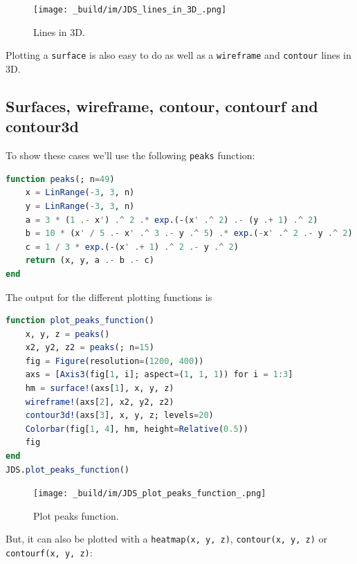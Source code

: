 \documentclass[
  notoc %
]{tufte-book}
\newcommand{\passthrough}[1]{#1}
\begin{document}
\begin{figure}
\hypertarget{fig:lines_in_3D}{%
\centering
\texttt{[image: \_build/im/JDS\_lines\_in\_3D\_.png]}
\caption{Lines in 3D.}\label{fig:lines_in_3D}
}
\end{figure}

Plotting a \passthrough{\lstinline!surface!} is also easy to do as well
as a \passthrough{\lstinline!wireframe!} and
\passthrough{\lstinline!contour!} lines in 3D.

\hypertarget{surfaces-wireframe-contour-contourf-and-contour3d}{%
\subsection{Surfaces, wireframe, contour, contourf and
contour3d}\label{surfaces-wireframe-contour-contourf-and-contour3d}}

To show these cases we'll use the following
\passthrough{\lstinline!peaks!} function:

\begin{lstlisting}[language=Julia]
function peaks(; n=49)
    x = LinRange(-3, 3, n)
    y = LinRange(-3, 3, n)
    a = 3 * (1 .- x') .^ 2 .* exp.(-(x' .^ 2) .- (y .+ 1) .^ 2)
    b = 10 * (x' / 5 .- x' .^ 3 .- y .^ 5) .* exp.(-x' .^ 2 .- y .^ 2)
    c = 1 / 3 * exp.(-(x' .+ 1) .^ 2 .- y .^ 2)
    return (x, y, a .- b .- c)
end
\end{lstlisting}

The output for the different plotting functions is

\begin{lstlisting}[language=Julia]
function plot_peaks_function()
    x, y, z = peaks()
    x2, y2, z2 = peaks(; n=15)
    fig = Figure(resolution=(1200, 400))
    axs = [Axis3(fig[1, i]; aspect=(1, 1, 1)) for i = 1:3]
    hm = surface!(axs[1], x, y, z)
    wireframe!(axs[2], x2, y2, z2)
    contour3d!(axs[3], x, y, z; levels=20)
    Colorbar(fig[1, 4], hm, height=Relative(0.5))
    fig
end
JDS.plot_peaks_function()
\end{lstlisting}

\begin{figure}
\hypertarget{fig:plot_peaks_function}{%
\centering
\texttt{[image: \_build/im/JDS\_plot\_peaks\_function\_.png]}
\caption{Plot peaks function.}\label{fig:plot_peaks_function}
}
\end{figure}

But, it can also be plotted with a
\passthrough{\lstinline!heatmap(x, y, z)!},
\passthrough{\lstinline!contour(x, y, z)!} or
\passthrough{\lstinline!contourf(x, y, z)!}:
\end{document}
